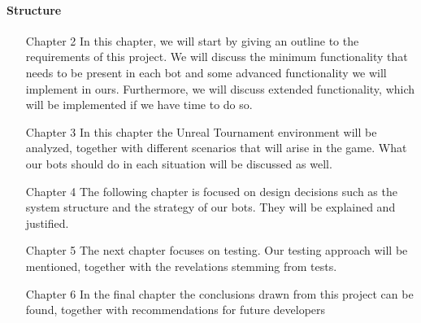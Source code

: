 \paragraph{Structure}

\begin{enumerate}
\item[Chapter 2] In this chapter, we will start by giving an outline to the requirements of this project. We will discuss the minimum functionality that needs to be present in each bot and some advanced functionality we will implement in ours. Furthermore, we will discuss extended functionality, which will be implemented if we have time to do so.

\item[Chapter 3] In this chapter the Unreal Tournament environment will be analyzed, together with different scenarios that will arise in the game. What our bots should do in each situation will be discussed as well.

\item[Chapter 4] The following chapter is focused on design decisions such as the system structure and the strategy of our bots. They will be explained and justified.

\item[Chapter 5] The next chapter focuses on testing. Our testing approach will be mentioned, together with the revelations stemming from tests.

\item[Chapter 6] In the final chapter the conclusions drawn from this project can be found, together with recommendations for future developers
\end{enumerate}